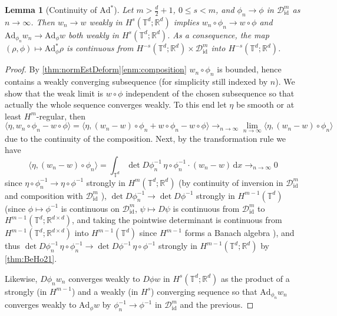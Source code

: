 \documentclass[a4paper, 12pt]{article}
\newtheorem{lemma}[theorem]{Lemma}
\newcommand{\R}{\mathbb{R}}
\newcommand{\T}{\mathbb{T}}
\renewcommand{\d}{\mathrm{d}}
\newcommand{\id}{\mathrm{id}}
\newcommand{\DiffSobId}{\mathcal D_{\id}}
\newcommand{\adjointMap}{\mathrm{Ad}}
\begin{document}
\begin{lemma}[Continuity of $\adjointMap^*$]\label{thm:continuityAdjointAdjointMap}
Let $m>\frac d2+1$, $0\leq s<m$, and $\phi_n\to\phi$ in $\DiffSobId^m$ as $n\to\infty$.
Then $w_n\to w$ weakly in $H^s(\T^d;\R^d)$ implies
$w_n\circ\phi_n\to w\circ\phi$ and $\adjointMap_{\phi_n}w_n\to\adjointMap_\phi w$ both weakly in $H^s(\T^d;\R^d)$.
As a consequence, the map $(\rho,\phi)\mapsto\adjointMap_\phi^*\rho$ is continuous from $H^{-s}(\T^d;\R^d)\times\DiffSobId^m$ into $H^{-s}(\T^d;\R^d)$.
\end{lemma}
\begin{proof}
By \cref{thm:normEstDeform}\eqref{enm:composition} $w_n\circ\phi_n$ is bounded, hence contains a weakly converging subsequence (for simplicity still indexed by $n$).
We show that the weak limit is $w\circ\phi$ independent of the chosen subsequence so that actually the whole sequence converges weakly.
To this end let $\eta$ be smooth or at least $H^m$-regular, then
\begin{equation*}
\langle\eta,w_n\circ\phi_n-w\circ\phi\rangle
=\langle\eta,(w_n-w)\circ\phi_n+w\circ\phi_n-w\circ\phi\rangle
\mathop\to_{n\to\infty}\lim_{n\to\infty}\langle\eta,(w_n-w)\circ\phi_n\rangle
\end{equation*}
due to the continuity of the composition. Next, by the transformation rule we have
\begin{equation*}
\langle\eta,(w_n-w)\circ\phi_n\rangle
=\int_{\T^d}\det D\phi_n^{-1}\,\eta\circ\phi_n^{-1}\cdot(w_n-w)\,\d x
\mathop\to_{n\to\infty}0
\end{equation*}
since $\eta\circ\phi_n^{-1}\to\eta\circ\phi^{-1}$ strongly in $H^m(\T^d;\R^d)$ (by continuity of inversion in $\DiffSobId^m$ and composition with $\DiffSobId^m$ \cite[Lemmas 2.7-2.8]{InKaTo13}),
$\det D\phi_n^{-1}\to\det D\phi^{-1}$ strongly in $H^{m-1}(\T^d)$
(since $\phi\mapsto\phi^{-1}$ is continuous on $\DiffSobId^m$,
$\psi\mapsto D\psi$ is continuous from $\DiffSobId^m$ to $H^{m-1}(\T^d;\R^{d\times d})$,
and taking the pointwise determinant is continuous from $H^{m-1}(\T^d;\R^{d\times d})$ into $H^{m-1}(\T^d)$ since $H^{m-1}$ forms a Banach algebra \cite[Lemma 2.16]{InKaTo13}),
and thus $\det D\phi_n^{-1}\,\eta\circ\phi_n^{-1}\to\det D\phi^{-1}\,\eta\circ\phi^{-1}$ strongly in $H^{m-1}(\T^d;\R^d)$ by \cref{thm:BeHo21}.

Likewise, $D\phi_nw_n$ converges weakly to $D\phi w$ in $H^s(\T^d;\R^d)$ as the product of a strongly (in $H^{m-1}$) and a weakly (in $H^s$) converging sequence
so that $\adjointMap_{\phi_n}w_n$ converges weakly to $\adjointMap_\phi w$ by $\phi_n^{-1}\to\phi^{-1}$ in $\DiffSobId^m$ and the previous.


\end{proof}
\end{document}

